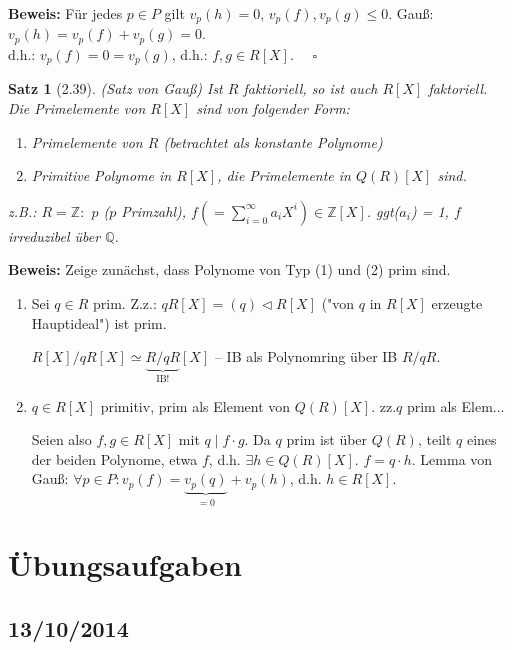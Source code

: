 \documentclass[10pt,a4paper]{article}
\newtheorem{satz}{Satz}
\begin{document}
\textbf{Beweis:} Für jedes $p \in P$ gilt $v_p(h) = 0$, $v_p(f), v_p(g) \leq 0$. Gauß: $v_p(h) = v_p(f) + v_p(g) = 0$.\\
d.h.: $v_p(f) = 0 = v_p(g)$, d.h.: $f,g \in R[X]$. $\quad \square$

\begin{satz}[2.39](Satz von Gauß)
Ist $R$ faktioriell, so ist auch $R[X]$ faktoriell. Die Primelemente von $R[X]$ sind von folgender Form:\begin{enumerate}
\item Primelemente von $R$ (betrachtet als konstante Polynome)
\item Primitive Polynome in $R[X]$, die Primelemente in $Q(R)[X]$ sind. 
\end{enumerate}

z.B.: $R = \mathbb{Z:}$ $p$ ($p$ Primzahl), $f (= \sum_{i=0}^{\infty} a_i X^i) \in \mathbb{Z}[X]$. ggt($a_i$) = 1, $f$ irreduzibel über $\mathbb{Q}$.
\end{satz}

\textbf{Beweis:} Zeige zunächst, dass Polynome von Typ (1) und (2) prim sind.

\begin{enumerate}
\item Sei $q \in R$ prim. Z.z.: $qR[X] = (q) \triangleleft R[X]$ ("von $q$ in $R[X]$ erzeugte Hauptideal") ist prim.

$R[X]/qR[X] \simeq \underbrace{R/qR}_{\text{IB!}}[X]$ -- IB als Polynomring über IB $R/qR$.

\item $q \in R[X]$ primitiv, prim als Element von $Q(R)[X]$. zz.$q$ prim als Elem...

Seien also $f,g \in R[X]$ mit $q \mid f \cdot g$. Da $q$ prim ist über $Q(R)$, teilt $q$ eines der beiden Polynome, etwa $f$, d.h. $\exists h \in Q(R)[X]$. $f = q \cdot h$. Lemma von Gauß: $\forall p \in P: v_p(f) = \underbrace{v_p(q)}_{=0} + v_p(h) $, d.h. $h \in R[X]$.
\end{enumerate}


\newpage
\section{Übungsaufgaben}

\subsection{13/10/2014}
\end{document}
